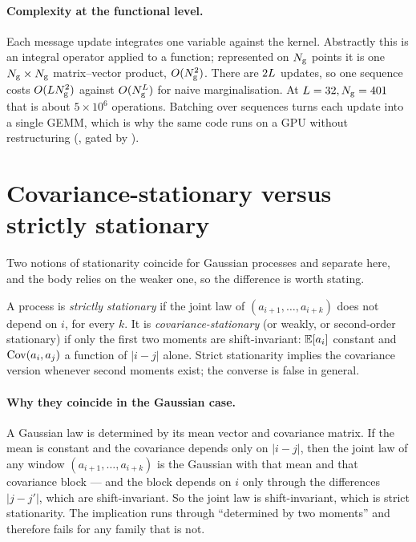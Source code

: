 \paragraph{Complexity at the functional level.} Each message update integrates one variable
against the kernel. Abstractly this is an integral operator applied to a function; represented on
$N_{\mathrm{g}}$ points it is one $N_{\mathrm{g}}\times N_{\mathrm{g}}$ matrix--vector product, $O(N_{\mathrm{g}}^2)$. There are
$2L$ updates, so one sequence costs $O(LN_{\mathrm{g}}^2)$ against $O(N_{\mathrm{g}}^{L})$ for
naive marginalisation. At $L=32,N_{\mathrm{g}}=401$ that is about $5\times10^6$ operations.
Batching over sequences turns each update into a single GEMM, which is why the same code runs on
a GPU without restructuring (, gated by
).

\section{Covariance-stationary versus strictly stationary}
\label{app:stationary}

Two notions of stationarity coincide for Gaussian processes and separate here, and the body
relies on the weaker one, so the difference is worth stating.

A process is \emph{strictly stationary} if the joint law of $(a_{i+1},\dots,a_{i+k})$ does not
depend on $i$, for every $k$. It is \emph{covariance-stationary} (or weakly, or second-order
stationary) if only the first two moments are shift-invariant: $\mathbb{E}[a_i]$ constant and
$\operatorname{Cov}(a_i,a_j)$ a function of $|i-j|$ alone. Strict stationarity implies the covariance version
whenever second moments exist; the converse is false in general.

\paragraph{Why they coincide in the Gaussian case.} A Gaussian law is determined by its mean
vector and covariance matrix. If the mean is constant and the covariance depends only on $|i-j|$,
then the joint law of any window $(a_{i+1},\dots,a_{i+k})$ is the Gaussian with that mean and that
covariance block --- and the block depends on $i$ only through the differences $|j-j'|$, which are
shift-invariant. So the joint law is shift-invariant, which is strict stationarity. The
implication runs through ``determined by two moments'' and therefore fails for any family that is
not.

